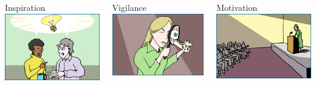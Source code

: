 \documentclass[t]{beamer}
\begin{document}
\begin{ftst}
\begin{columns}[T]
\begin{block}{Inspiration}
	\centering\includegraphics[width=\textwidth]{../figs/community3.png}
\end{block}
\begin{block}{Vigilance}
	\centering\includegraphics[width=\textwidth]{../figs/community4.png}
\end{block}
\begin{block}{Motivation}
	\centering\includegraphics[width=\textwidth]{../figs/community5.png}

\end{block}
\end{columns}
\end{ftst}
\end{document}
